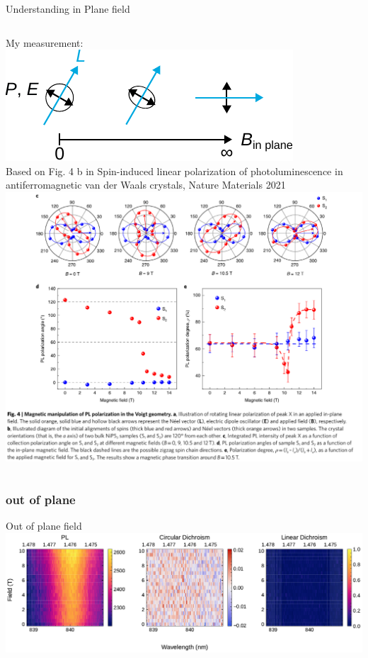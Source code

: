 \begin{frame}{Understanding in Plane field}
	\begin{columns}
		My measurement:\\\vspace{1cm}
		\centering
		\includegraphics{../figures/vector_rotation.pdf}
		\\\vspace{1cm}\raggedleft\small
		Based on Fig. 4 b in Spin-induced linear polarization of photoluminescence in antiferromagnetic van der Waals crystals, Nature Materials 2021
		\centering
		\includegraphics[width=\textwidth]{image12.png}

	\end{columns}
\end{frame}

\subsubsection{out of plane}
\begin{frame}{Out of plane field}
	\centering
	\includegraphics{../figures/2023-12-10 circular dichroism 2023-12-11_NiPS3 d002_flake04_50K_circPol_inPlane.pdf}
\end{frame}

